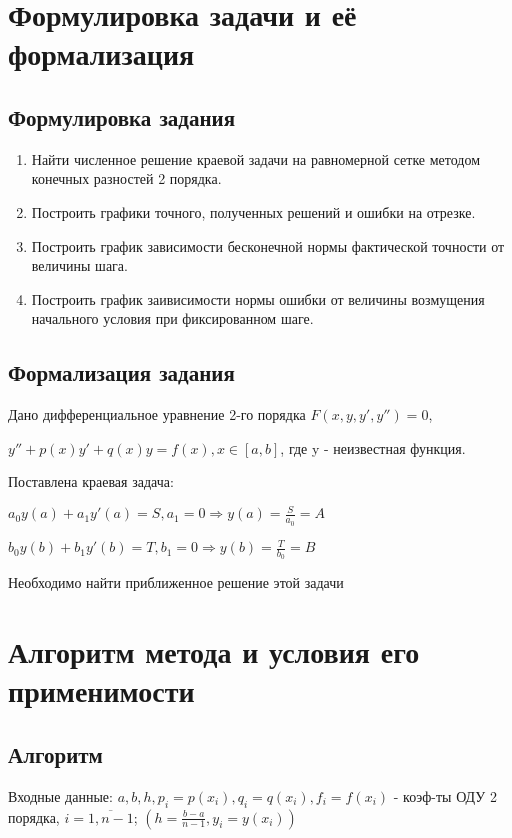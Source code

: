 \documentclass{article}
\begin{document}
	\newpage
	
	\section{Формулировка задачи и её формализация}
	\subsection{Формулировка задания}
	\begin{enumerate}
		\item Найти численное решение краевой задачи на равномерной
		сетке методом конечных разностей 2 порядка. 
		\item  Построить графики точного, полученных решений и ошибки на отрезке.
		\item Построить график зависимости бесконечной нормы фактической точности от величины шага.
		\item Построить график заивисимости нормы ошибки от величины возмущения начального условия при фиксированном
		шаге.
		
	\end{enumerate}	
	
	\subsection{Формализация задания}
	Дано дифференциальное уравнение 2-го порядка $F(x,y,y',y'')=0$,
	
	$y''+ p(x)y'+q(x)y = f(x), x \in [a, b]$, где y - неизвестная функция.
	
	Поставлена краевая задача:
	
	$a_0y(a)+a_1y'(a) = S, a_1 = 0 \Rightarrow y(a) = \frac{S}{a_0} = A$
	
	$b_0y(b)+b_1y'(b) = T, b_1 = 0 \Rightarrow y(b) = \frac{T}{b_0} = B$
	
	Необходимо найти приближенное решение этой задачи
	
	\section{Алгоритм метода и условия его применимости}   
	
	\subsection{Алгоритм}
	Входные данные: $a, b, h, p_i=p(x_i), q_i=q(x_i), f_i=f(x_i)$ - коэф-ты ОДУ 2 порядка, $i = \overline{1, n-1}$;  	
	$(h = \frac{b-a}{n-1}, y_i = y(x_i))$
	
\end{document}
